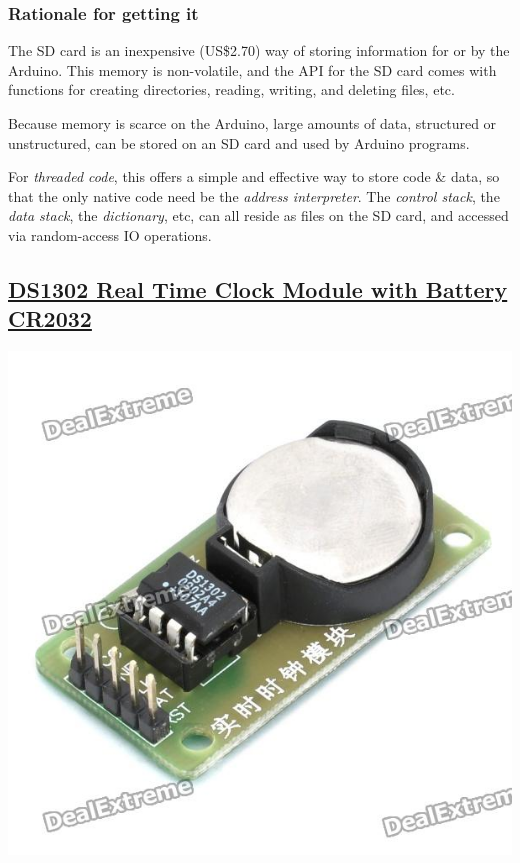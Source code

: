 \documentclass[11pt]{article}
\begin{document}
\subsubsection{Rationale for getting it}
\label{sec-4-7-1}

The SD card is an inexpensive (US\$2.70) way of storing information for or by the Arduino. This memory is non-volatile, and the API for the SD card comes with functions for creating directories, reading, writing, and deleting files, etc.

Because memory is scarce on the Arduino, large amounts of data, structured or unstructured, can be stored on an SD card and used by Arduino programs. 

For \emph{threaded code}, this offers a simple and effective way to store code \& data, so that the only native code need be the \emph{address interpreter}. The \emph{control stack}, the \emph{data stack}, the \emph{dictionary}, etc, can all reside as files on the SD card, and accessed via random-access IO operations.
\subsection{\href{http://dx.com/p/ds1302-real-time-clock-module-with-battery-cr2032-126453}{DS1302 Real Time Clock Module with Battery CR2032}}
\label{sec-4-8}

\includegraphics[width=.9\linewidth]{./files/sku_126453_2.jpg}
\end{document}
